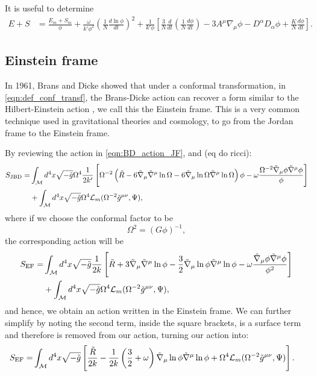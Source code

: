It is useful to determine
\begin{align}
    E+S&=\frac{E_m+S_m}{\phi}+\frac{\omega}{k'\phi^2}\left(\frac{1}{N}\frac{d\ln\phi}{dt}\right)^2+\frac{1}{k'\phi}\left[\frac{3}{N}\frac{d}{dt}\left(\frac{1}{N}\frac{d\phi}{dt}\right)-3A^\mu\nabla_\mu\phi-D^\alpha D_\alpha\phi+\frac{K}{N}\frac{d\phi}{dt}\right].
    \label{eqn:raych_useful}
\end{align}



\subsection{Einstein frame}

In 1961, Brans and Dicke showed that under a conformal transformation, in \cref{eqn:def_conf_transf}, the Brans-Dicke action can recover a form similar to the Hilbert-Einstein action \cite{Brans_1961}, we call this the Einstein frame. This is a very common technique used in gravitational theories and cosmology, to go from the Jordan frame to the Einstein frame.


By reviewing the action in \cref{eqn:BD_action_JF}, and (eq do ricci):
\begin{align}
    S_{\text{JBD}}=&\int_{\mathcal{M}} d^4x\sqrt{-\Tilde{g}}\Omega^4\frac{1}{2k'}\left[\Omega^{-2}\left(\Tilde{R}-6\Tilde{\nabla}_\mu\Tilde{\nabla}^\mu\ln\Omega-6\Tilde{\nabla}_\mu\ln\Omega\Tilde{\nabla}^\mu\ln\Omega\right)\phi-\omega \frac{\Omega^{-2}\Tilde{\nabla}_\mu\phi\Tilde{\nabla}^\mu\phi}{\phi}\right]\nonumber\\
    &+\int_{\mathcal{M}} d^4x\sqrt{-\Tilde{g}}\Omega^4\mathcal{L}_m(\Omega^{-2}\Tilde{g}^{\mu\nu},\Psi),
    \label{eqn:bd_ef_1}
\end{align}
where if we choose the conformal factor to be
\begin{equation}
    \Omega^2=(G\phi)^{-1},
\end{equation}
the corresponding action will be
\begin{align}
    S_{\text{EF}}=&\int_{\mathcal{M}} d^4x\sqrt{-\Tilde{g}}\frac{1}{2k}\left[\Tilde{R}+3\Tilde{\nabla}_\mu\Tilde{\nabla}^\mu\ln\phi-\frac{3}{2}\Tilde{\nabla}_\mu\ln\phi\Tilde{\nabla}^\mu\ln\phi-\omega \frac{\Tilde{\nabla}_\mu\phi\Tilde{\nabla}^\mu\phi}{\phi^2}\right]\nonumber\\
    &+\int_{\mathcal{M}} d^4x\sqrt{-\Tilde{g}}\Omega^4\mathcal{L}_m(\Omega^{-2}\Tilde{g}^{\mu\nu},\Psi),
    \label{eqn:bd_ef_2}
\end{align}
and hence, we obtain an action written in the Einstein frame. We can further simplify by noting the second term, inside the square brackets, is a surface term and therefore is removed from our action, turning our action into:
\begin{align}
    S_{\text{EF}}=&\int_{\mathcal{M}} d^4x\sqrt{-\Tilde{g}}\left[\frac{\Tilde{R}}{2k}-\frac{1}{2k}\left(\frac{3}{2}+\omega\right)\Tilde{\nabla}_\mu\ln\phi\Tilde{\nabla}^\mu\ln\phi+\Omega^4\mathcal{L}_m(\Omega^{-2}\Tilde{g}^{\mu\nu},\Psi)\right].
    \label{eqn:bd_ef_3}
\end{align}

